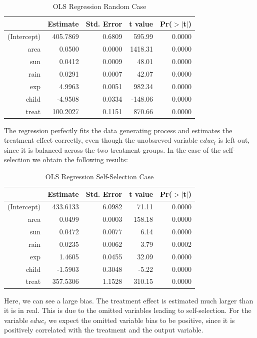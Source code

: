 \begin{enumerate}
\begin{table}[h!]
\centering
\begin{threeparttable}
\caption{OLS Regression Random Case} \label{tab:reg1}
\begin{tabular}{rrrrr}
  \hline
 & Estimate & Std. Error & t value & Pr({$>$}{$|$}t$|$) \\ 
  \hline
(Intercept) & 405.7869 & 0.6809 & 595.99 & 0.0000 \\ 
  area & 0.0500 & 0.0000 & 1418.31 & 0.0000 \\ 
  sun & 0.0412 & 0.0009 & 48.01 & 0.0000 \\ 
  rain & 0.0291 & 0.0007 & 42.07 & 0.0000 \\ 
  exp & 4.9963 & 0.0051 & 982.34 & 0.0000 \\ 
  child & -4.9508 & 0.0334 & -148.06 & 0.0000 \\ 
  treat & 100.2027 & 0.1151 & 870.66 & 0.0000 \\ 
   \hline
\end{tabular}
\end{threeparttable}
\end{table}

The regression perfectly fits the data generating process and estimates the treatment effect correctly, even though the unobsreved variable $\textit{educ}_i$ is left out, since it is balanced across the two treatment groups. In the case of the self-selection we obtain the following results:

\begin{table}[h!]
\centering
\begin{threeparttable}
\caption{OLS Regression Self-Selection Case} \label{tab:reg2}
\begin{tabular}{rrrrr}
  \hline
 & Estimate & Std. Error & t value & Pr({$>$}{$|$}t$|$) \\ 
  \hline
(Intercept) & 433.6133 & 6.0982 & 71.11 & 0.0000 \\ 
  area & 0.0499 & 0.0003 & 158.18 & 0.0000 \\ 
  sun & 0.0472 & 0.0077 & 6.14 & 0.0000 \\ 
  rain & 0.0235 & 0.0062 & 3.79 & 0.0002 \\ 
  exp & 1.4605 & 0.0455 & 32.09 & 0.0000 \\ 
  child & -1.5903 & 0.3048 & -5.22 & 0.0000 \\ 
  treat & 357.5306 & 1.1528 & 310.15 & 0.0000 \\ 
   \hline
\end{tabular}
\end{threeparttable}
\end{table}

Here, we can see a large bias. The treatment effect is estimated much larger than it is in real. This is due to the omitted variables leading to self-selection. For the variable $\textit{educ}_i$ we expect the omitted variable bias to be positive, since it is positively correlated with the treatment and the output variable. 

\end{enumerate}



